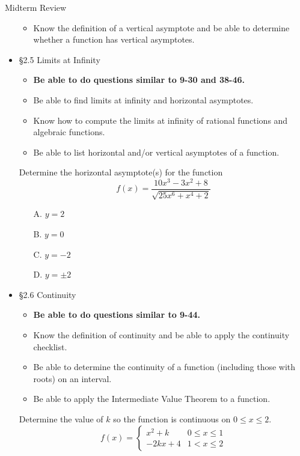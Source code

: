 \documentclass[cal1spr16Lectures.tex]{subfiles}
\begin{document}
\begin{frame}[allowframebreaks]{Midterm Review}
\begin{itemize}
\begin{itemize}
	\item Know the \alert{definition} of a vertical asymptote and be able to determine whether a function has vertical asymptotes.
	\end{itemize}
%
\framebreak
\item \S 2.5 Limits at Infinity
	\begin{itemize}\footnotesize
	\item {\bf Be able to do questions similar to 9-30 and 38-46.}
	\item Be able to find limits at infinity and horizontal asymptotes. 
	\item Know how to compute the limits at infinity of rational functions and algebraic functions.
	\item Be able to list horizontal and/or vertical asymptotes of a function.
	\end{itemize}
\begin{exe}
Determine the horizontal asymptote(s) for the function
\[
f(x)=\frac{10x^3-3x^2+8}{\sqrt{25x^6+x^4+2}}
\]
\begin{itemize}
\item[A. ] $y=2$
\item[B. ] $y=0$
\item[C. ] $y=-2$
\item[D. ] $y=\pm 2$
\end{itemize}
\end{exe}	

\framebreak	
\item \S 2.6 Continuity
	\begin{itemize}\footnotesize
	\item {\bf Be able to do questions similar to 9-44.}
	\item Know the definition of continuity and be able to apply the continuity checklist.
	\item Be able to determine the continuity of a function (including those with roots) on an interval.
	\item Be able to apply the Intermediate Value Theorem to a function.
	\end{itemize}
\framebreak
\begin{exe}
Determine the value of $k$ so the function is continuous on $0\leq x\leq 2$.
\[f(x)=\begin{cases}x^2+k & 0\leq x\leq 1 \\
	-2kx+4 & 1<x\leq 2\end{cases}
	\]
\end{exe}	


\end{itemize}
\end{frame}
\end{document}
